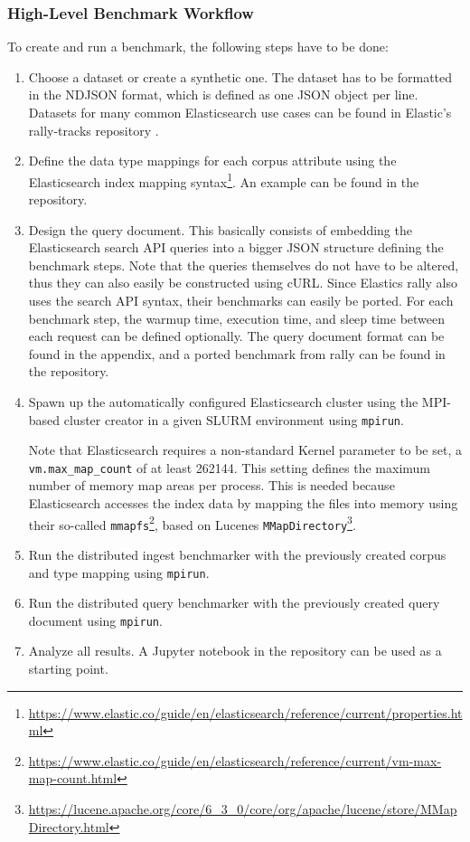 \subsubsection{High-Level Benchmark Workflow}
To create and run a benchmark, the following steps have to be done:
\begin{enumerate}
  \item Choose a dataset or create a synthetic one. The dataset has to be formatted in the \ac{NDJSON} format, which is defined as one JSON object per line. Datasets for many common Elasticsearch use cases can be found in Elastic's rally-tracks repository \cite{rallytracks}.
  \item Define the data type mappings for each corpus attribute using the Elasticsearch index mapping syntax\footnote{\url{https://www.elastic.co/guide/en/elasticsearch/reference/current/properties.html}}. An example can be found in the repository.
  \item Design the query document. This basically consists of embedding the Elasticsearch search API queries into a bigger JSON structure defining the benchmark steps.  Note that the queries themselves do not have to be altered, thus they can also easily be constructed using cURL. Since Elastics rally also uses the search API syntax, their benchmarks can easily be ported. For each benchmark step, the warmup time, execution time, and sleep time between each request can be defined optionally. The query document format can be found in the appendix, and a ported benchmark from rally can be found in the repository.
  \item Spawn up the automatically configured Elasticsearch cluster using the \ac{MPI}-based cluster creator in a given SLURM environment using \texttt{mpirun}. 

    Note that Elasticsearch requires a non-standard Kernel parameter to be set, a \texttt{vm.max\_map\_count} of at least 262144. This setting defines the maximum number of memory map areas per process. This is needed because Elasticsearch accesses the index data by mapping the files into memory using their so-called \texttt{mmapfs}\footnote{\url{https://www.elastic.co/guide/en/elasticsearch/reference/current/vm-max-map-count.html}}, based on Lucenes \texttt{MMapDirectory}\footnote{\url{https://lucene.apache.org/core/6_3_0/core/org/apache/lucene/store/MMapDirectory.html}}.
  \item Run the distributed ingest benchmarker with the previously created corpus and type mapping using \texttt{mpirun}.
  \item Run the distributed query benchmarker with the previously created query document using \texttt{mpirun}.
  \item Analyze all results. A Jupyter notebook in the repository can be used as a starting point.
\end{enumerate}

